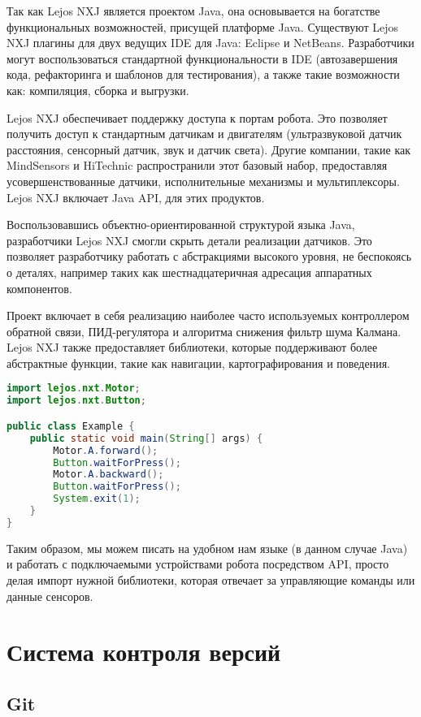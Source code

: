 Так как Lejos NXJ является проектом Java, она основывается на богатстве функциональных возможностей, присущей платформе Java. Существуют Lejos NXJ плагины для двух ведущих IDE для Java: Eclipse и NetBeans. Разработчики могут воспользоваться стандартной функциональности в IDE (автозавершения кода, рефакторинга и шаблонов для тестирования), а также такие возможности как: компиляция, сборка и выгрузки. 

Lejos NXJ обеспечивает поддержку доступа к портам робота. Это позволяет получить доступ к стандартным датчикам и двигателям (ультразвуковой датчик расстояния, сенсорный датчик, звук и датчик света). Другие компании, такие как MindSensors и HiTechnic распространили этот базовый набор, предоставляя усовершенствованные датчики, исполнительные механизмы и мультиплексоры. Lejos NXJ включает Java API, для этих продуктов.

Воспользовавшись объектно-ориентированной структурой языка Java, разработчики Lejos NXJ смогли скрыть детали реализации датчиков. Это позволяет разработчику работать с абстракциями высокого уровня, не беспокоясь о деталях, например таких как шестнадцатеричная адресация аппаратных компонентов.

Проект включает в себя реализацию наиболее часто используемых контроллером обратной связи, ПИД-регулятора и алгоритма снижения фильтр шума Калмана. Lejos NXJ также предоставляет библиотеки, которые поддерживают более абстрактные функции, такие как навигации, картографирования и поведения.

\begin{lstlisting}[caption={Пример кода для работы с двигателями}, language=Java]
import lejos.nxt.Motor;
import lejos.nxt.Button;

public class Example {
    public static void main(String[] args) {
        Motor.A.forward();
        Button.waitForPress();
        Motor.A.backward();
        Button.waitForPress();
        System.exit(1);
    }
}
\end{lstlisting}


Таким образом, мы можем писать на удобном нам языке (в данном случае Java) и работать с подключаемыми устройствами робота посредством API, просто делая импорт нужной библиотеки, которая отвечает за управляющие команды или данные сенсоров.

\section{Система контроля версий}
\subsection{Git}


